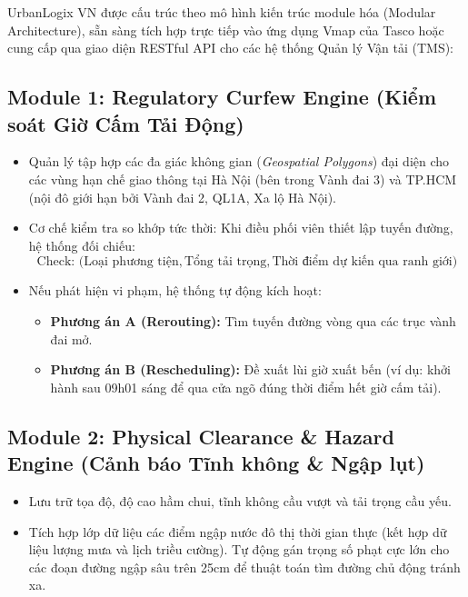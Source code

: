 \documentclass[11pt,a4paper]{article}
\begin{document}
UrbanLogix VN được cấu trúc theo mô hình kiến trúc module hóa (Modular Architecture), sẵn sàng tích hợp trực tiếp vào ứng dụng Vmap của Tasco hoặc cung cấp qua giao diện RESTful API cho các hệ thống Quản lý Vận tải (TMS):

\subsection{Module 1: Regulatory Curfew Engine (Kiểm soát Giờ Cấm Tải Động)}
\begin{itemize}
  \item Quản lý tập hợp các đa giác không gian (\textit{Geospatial Polygons}) đại diện cho các vùng hạn chế giao thông tại Hà Nội (bên trong Vành đai 3) và TP.HCM (nội đô giới hạn bởi Vành đai 2, QL1A, Xa lộ Hà Nội).
  \item Cơ chế kiểm tra so khớp tức thời: Khi điều phối viên thiết lập tuyến đường, hệ thống đối chiếu:
  $$\text{Check: } \big(\text{Loại phương tiện}, \text{Tổng tải trọng}, \text{Thời điểm dự kiến qua ranh giới}\big)$$
  \item Nếu phát hiện vi phạm, hệ thống tự động kích hoạt:
  \begin{itemize}
    \item \textbf{Phương án A (Rerouting):} Tìm tuyến đường vòng qua các trục vành đai mở.
    \item \textbf{Phương án B (Rescheduling):} Đề xuất lùi giờ xuất bến (ví dụ: khởi hành sau 09h01 sáng để qua cửa ngõ đúng thời điểm hết giờ cấm tải).
  \end{itemize}
\end{itemize}

\subsection{Module 2: Physical Clearance \& Hazard Engine (Cảnh báo Tĩnh không \& Ngập lụt)}
\begin{itemize}
  \item Lưu trữ tọa độ, độ cao hầm chui, tĩnh không cầu vượt và tải trọng cầu yếu.
  \item Tích hợp lớp dữ liệu các điểm ngập nước đô thị thời gian thực (kết hợp dữ liệu lượng mưa và lịch triều cường). Tự động gán trọng số phạt cực lớn cho các đoạn đường ngập sâu trên 25cm để thuật toán tìm đường chủ động tránh xa.
\end{itemize}
\end{document}
